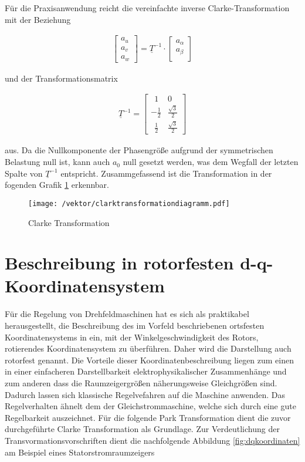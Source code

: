 Für die Praxisanwendung reicht die vereinfachte inverse Clarke-Transformation mit der Beziehung

\begin{align}
	\begin{bmatrix}
		a_{u} \\
		a_{v} \\
		a_{w}
	\end{bmatrix}
	=\underline{T}^{-1}\cdot 
	\begin{bmatrix}
		a_{\alpha} \\
		a_{\beta} \\
	\end{bmatrix}
	\label{inverseclarkevektornulleinfach}
\end{align}
 
 und der Transformationsmatrix 
 
 \begin{align}
 	\underline{T}^{-1} =
 	\begin{bmatrix}
 		~~1 & 0   \\
 		-\frac{1}{2} & \frac{\sqrt{3}}{2}  \\
 		~~\frac{1}{2} & \frac{\sqrt{3}}{2} 
 	\end{bmatrix}
 	\label{inverseclarkematrixnulleinfach}
 \end{align}
 
 aus. 
 Da die Nullkomponente der Phasengröße aufgrund der symmetrischen Belastung null ist, kann auch $a_{0}$ null gesetzt werden, was dem Wegfall der letzten Spalte von ${\underline{T}^{-1}}$ entspricht. Zusammgefassend ist die Transformation in der fogenden Grafik \ref{fig:clarktransformationdiagramm} erkennbar.
 
 \begin{figure}[h]
 	\centering
 	\texttt{[image: /vektor/clarktransformationdiagramm.pdf]}
 	\label{fig:clarktransformationdiagramm}
 	\caption{Clarke Transformation}
 \end{figure}
 

\section{Beschreibung in rotorfesten d-q-Koordinatensystem}\label{sec:park}

Für die Regelung von Drehfeldmaschinen hat es sich als praktikabel herausgestellt, die Beschreibung des im Vorfeld beschriebenen ortsfesten Koordinatensystems in ein, mit der Winkelgeschwindigkeit des Rotors, rotierendes Koordinatensystem zu überführen. 
Daher wird die Darstellung auch rotorfest genannt. 
Die Vorteile dieser Koordinatenbeschreibung liegen zum einen in einer einfacheren Darstellbarkeit elektrophysikalischer Zusammenhänge und zum anderen dass die Raumzeigergrößen näherungsweise Gleichgrößen sind.
Dadurch lassen sich klassische Regelvefahren auf die Maschine anwenden.
Das Regelverhalten ähnelt dem der Gleichstrommaschine, welche sich durch eine gute Regelbarkeit auszeichnet. 
Für die folgende Park Transformation dient die zuvor durchgeführte Clarke Transformation als Grundlage. 
Zur Verdeutlichung der Transvormationsvorschriften dient die nachfolgende Abbildung \ref{fig:dqkoordinaten} am Beispiel eines Statorstromraumzeigers

